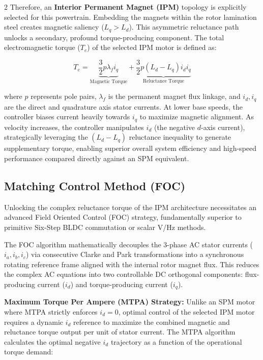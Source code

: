\begin{multicols}{2}
Therefore, an \textbf{Interior Permanent Magnet (IPM)} topology is explicitly selected for this powertrain. Embedding the magnets within the rotor lamination steel creates magnetic saliency ($L_q > L_d$). This asymmetric reluctance path unlocks a secondary, profound torque-producing component. The total electromagnetic torque ($T_e$) of the selected IPM motor is defined as:

\begin{equation} \label{eq:ipm_torque}
T_e = \underbrace{\frac{3}{2} p \lambda_f i_q}_{\text{Magnetic Torque}} + \underbrace{\frac{3}{2} p (L_d - L_q) i_d i_q}_{\text{Reluctance Torque}}
\end{equation}

where $p$ represents pole pairs, $\lambda_f$ is the permanent magnet flux linkage, and $i_d, i_q$ are the direct and quadrature axis stator currents. At lower base speeds, the controller biases current heavily towards $i_q$ to maximize magnetic alignment. As velocity increases, the controller manipulates $i_d$ (the negative $d$-axis current), strategically leveraging the $(L_d - L_q)$ reluctance inequality to generate supplementary torque, enabling superior overall system efficiency and high-speed performance compared directly against an SPM equivalent.

\subsection{Matching Control Method (FOC)}

Unlocking the complex reluctance torque of the IPM architecture necessitates an advanced Field Oriented Control (FOC) strategy, fundamentally superior to primitive Six-Step BLDC commutation or scalar V/Hz methods.

The FOC algorithm mathematically decouples the 3-phase AC stator currents ($i_a, i_b, i_c$) via consecutive Clarke and Park transformations into a synchronous rotating reference frame aligned with the internal rotor magnet flux. This reduces the complex AC equations into two controllable DC orthogonal components: flux-producing current ($i_d$) and torque-producing current ($i_q$).

\textbf{Maximum Torque Per Ampere (MTPA) Strategy:}
Unlike an SPM motor where MTPA strictly enforces $i_d = 0$, optimal control of the selected IPM motor requires a dynamic $i_d$ reference to maximize the combined magnetic and reluctance torque output per unit of stator current. The MTPA algorithm calculates the optimal negative $i_d$ trajectory as a function of the operational torque demand:


\end{multicols}
